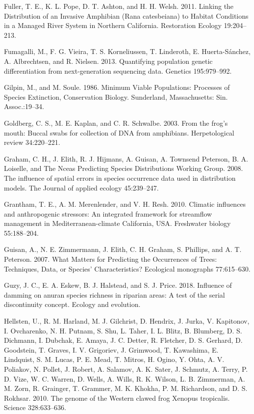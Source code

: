 \documentclass[twoside,12pt,final]{ucthesis-CA2012} %
\begin{document}
\begin{ucmainmatter}
\leavevmode\hypertarget{ref-fuller_linking_2011}{}%
Fuller, T. E., K. L. Pope, D. T. Ashton, and H. H. Welsh. 2011. Linking
the Distribution of an Invasive Amphibian (Rana catesbeiana) to Habitat
Conditions in a Managed River System in Northern California. Restoration
Ecology 19:204--213.

\leavevmode\hypertarget{ref-fumagalli_quantifying_2013}{}%
Fumagalli, M., F. G. Vieira, T. S. Korneliussen, T. Linderoth, E.
Huerta-Sánchez, A. Albrechtsen, and R. Nielsen. 2013. Quantifying
population genetic differentiation from next-generation sequencing data.
Genetics 195:979--992.

\leavevmode\hypertarget{ref-gilpin_minimum_1986}{}%
Gilpin, M., and M. Soule. 1986. Minimum Viable Populations: Processes of
Species Extinction, Conservation Biology. Sunderland, Massachusetts:
Sin. Assoc.:19--34.

\leavevmode\hypertarget{ref-goldberg_frogs_2003}{}%
Goldberg, C. S., M. E. Kaplan, and C. R. Schwalbe. 2003. From the frog's
mouth: Buccal swabs for collection of DNA from amphibians.
Herpetological review 34:220--221.

\leavevmode\hypertarget{ref-graham_influence_2008}{}%
Graham, C. H., J. Elith, R. J. Hijmans, A. Guisan, A. Townsend Peterson,
B. A. Loiselle, and The Nceas Predicting Species Distributions Working
Group. 2008. The influence of spatial errors in species occurrence data
used in distribution models. The Journal of applied ecology 45:239--247.

\leavevmode\hypertarget{ref-grantham_climatic_2010}{}%
Grantham, T. E., A. M. Merenlender, and V. H. Resh. 2010. Climatic
influences and anthropogenic stressors: An integrated framework for
streamflow management in Mediterranean-climate California, USA.
Freshwater biology 55:188--204.

\leavevmode\hypertarget{ref-guisan_what_2007}{}%
Guisan, A., N. E. Zimmermann, J. Elith, C. H. Graham, S. Phillips, and
A. T. Peterson. 2007. What Matters for Predicting the Occurrences of
Trees: Techniques, Data, or Species' Characteristics? Ecological
monographs 77:615--630.

\leavevmode\hypertarget{ref-guzy_influence_2018}{}%
Guzy, J. C., E. A. Eskew, B. J. Halstead, and S. J. Price. 2018.
Influence of damming on anuran species richness in riparian areas: A
test of the serial discontinuity concept. Ecology and evolution.

\leavevmode\hypertarget{ref-hellsten_genome_2010}{}%
Hellsten, U., R. M. Harland, M. J. Gilchrist, D. Hendrix, J. Jurka, V.
Kapitonov, I. Ovcharenko, N. H. Putnam, S. Shu, L. Taher, I. L. Blitz,
B. Blumberg, D. S. Dichmann, I. Dubchak, E. Amaya, J. C. Detter, R.
Fletcher, D. S. Gerhard, D. Goodstein, T. Graves, I. V. Grigoriev, J.
Grimwood, T. Kawashima, E. Lindquist, S. M. Lucas, P. E. Mead, T.
Mitros, H. Ogino, Y. Ohta, A. V. Poliakov, N. Pollet, J. Robert, A.
Salamov, A. K. Sater, J. Schmutz, A. Terry, P. D. Vize, W. C. Warren, D.
Wells, A. Wills, R. K. Wilson, L. B. Zimmerman, A. M. Zorn, R. Grainger,
T. Grammer, M. K. Khokha, P. M. Richardson, and D. S. Rokhsar. 2010. The
genome of the Western clawed frog Xenopus tropicalis. Science
328:633--636.


\end{ucmainmatter}
\end{document}
